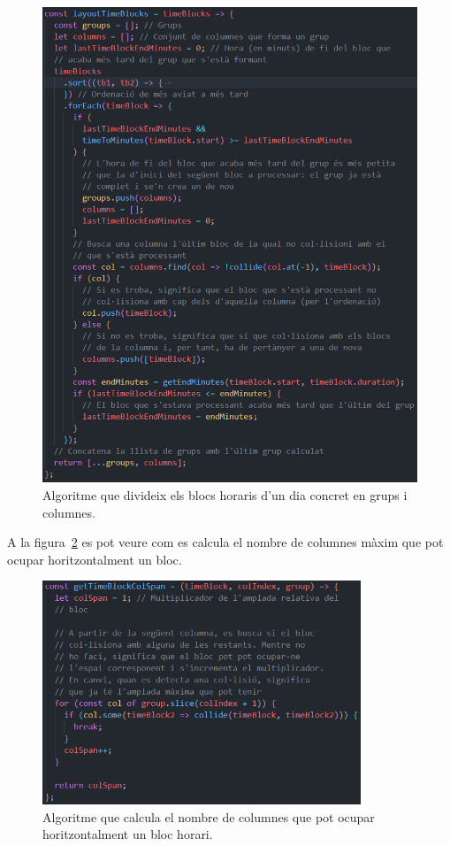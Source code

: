 \documentclass[a4paper,12pt]{ThesisStyle}
\begin{document}
\begin{figure}[H]
  \centering
  \includegraphics[width=\textwidth]{assets/code/usabilitat/layout.png}
  \caption{\label{img:layout} Algoritme que divideix els blocs horaris d'un dia concret en grups i columnes.}
\end{figure}

A la figura~\ref{img:colspan} es pot veure com es calcula el nombre de columnes màxim que pot ocupar horitzontalment un bloc.

\begin{figure}[H]
  \centering
  \includegraphics[width=0.85\textwidth]{assets/code/usabilitat/colSpan.png}
  \caption{\label{img:colspan} Algoritme que calcula el nombre de columnes que pot ocupar horitzontalment un bloc horari.}
\end{figure}
\end{document}
